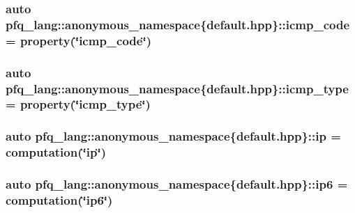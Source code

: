 \hypertarget{namespacepfq__lang_1_1anonymous__namespace_02default_8hpp_03_aad0f666aca065f5aaf283857e5c933ce}{
\subsubsection[{icmp\-\_\-code}]{\setlength{\rightskip}{0pt plus 5cm}auto pfq\-\_\-lang\-::anonymous\-\_\-namespace\{default.\-hpp\}\-::icmp\-\_\-code = {\bf property}(\char`\"{}icmp\-\_\-code\char`\"{})}}\label{namespacepfq__lang_1_1anonymous__namespace_02default_8hpp_03_aad0f666aca065f5aaf283857e5c933ce}
\hypertarget{namespacepfq__lang_1_1anonymous__namespace_02default_8hpp_03_a4adff7ced08caa2d0016a911dae6d2ed}{
\subsubsection[{icmp\-\_\-type}]{\setlength{\rightskip}{0pt plus 5cm}auto pfq\-\_\-lang\-::anonymous\-\_\-namespace\{default.\-hpp\}\-::icmp\-\_\-type = {\bf property}(\char`\"{}icmp\-\_\-type\char`\"{})}}\label{namespacepfq__lang_1_1anonymous__namespace_02default_8hpp_03_a4adff7ced08caa2d0016a911dae6d2ed}
\hypertarget{namespacepfq__lang_1_1anonymous__namespace_02default_8hpp_03_a27d30e7744c84a7cdc41a710ee16b885}{
\subsubsection[{ip}]{\setlength{\rightskip}{0pt plus 5cm}auto pfq\-\_\-lang\-::anonymous\-\_\-namespace\{default.\-hpp\}\-::ip = {\bf computation}(\char`\"{}ip\char`\"{})}}\label{namespacepfq__lang_1_1anonymous__namespace_02default_8hpp_03_a27d30e7744c84a7cdc41a710ee16b885}
\hypertarget{namespacepfq__lang_1_1anonymous__namespace_02default_8hpp_03_a566cbe8627dd2ae05071690ef64dbd12}{
\subsubsection[{ip6}]{\setlength{\rightskip}{0pt plus 5cm}auto pfq\-\_\-lang\-::anonymous\-\_\-namespace\{default.\-hpp\}\-::ip6 = {\bf computation}(\char`\"{}ip6\char`\"{})}}\label{namespacepfq__lang_1_1anonymous__namespace_02default_8hpp_03_a566cbe8627dd2ae05071690ef64dbd12}
